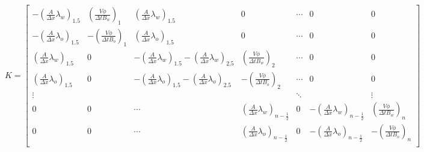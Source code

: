 \documentclass[final,5p]{elsarticle}
\numberwithin{equation}{section}
\begin{document}
        \begin{figure*}
        \begin{equation}
            K =
            \begin{bmatrix}
                    -\left( \frac{A}{\Delta x} \lambda_w \right)_{1.5} &  \left(\frac{V \phi}{\Delta t B_w}\right)_1 & \left( \frac{A}{\Delta x} \lambda_w \right)_{1.5} & 0 & \cdots & 0 & 0 \\
                    -\left( \frac{A}{\Delta x} \lambda_o \right)_{1.5} & -\left(\frac{V \phi}{\Delta t B_o}\right)_1 & \left( \frac{A}{\Delta x} \lambda_o \right)_{1.5} & 0 & \cdots & 0 & 0 \\

                    \left( \frac{A}{\Delta x} \lambda_w \right)_{1.5} & 0 & -\left( \frac{A}{\Delta x} \lambda_w \right)_{1.5}-\left( \frac{A}{\Delta x} \lambda_w \right)_{2.5} &  \left(\frac{V \phi}{\Delta t B_w}\right)_2 & \cdots & 0 & 0 \\
                    \left( \frac{A}{\Delta x} \lambda_o \right)_{1.5} & 0 & -\left( \frac{A}{\Delta x} \lambda_o \right)_{1.5}-\left( \frac{A}{\Delta x} \lambda_o \right)_{2.5} & -\left(\frac{V \phi}{\Delta t B_o}\right)_2 & \cdots & 0  & 0 \\

                    \vdots     &     &      &  & \ddots &  & \vdots \\
                    0 & 0 & \cdots & \left( \frac{A}{\Delta x} \lambda_w \right)_{n-\frac{1}{2}} &  0 & -\left( \frac{A}{\Delta x} \lambda_w \right)_{n-\frac{1}{2}} &  \left(\frac{V \phi}{\Delta t B_w}\right)_n \\
                    0 & 0 & \cdots & \left( \frac{A}{\Delta x} \lambda_o \right)_{n-\frac{1}{2}} &  0 & -\left( \frac{A}{\Delta x} \lambda_o \right)_{n-\frac{1}{2}} & -\left(\frac{V \phi}{\Delta t B_o}\right)_n \\
            \end{bmatrix}
            \label{eq:sistemak}
        \end{equation}
        \end{figure*}
\end{document}
